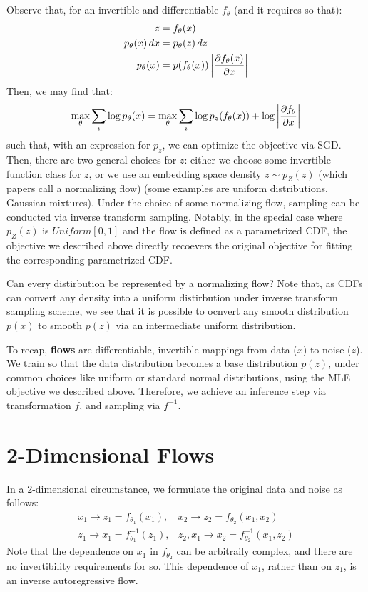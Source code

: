 Observe that, for an invertible and differentiable $f_\theta$ (and it requires so that):
\begin{align*}
    z &= f_\theta (x) \\
    p_\theta (x) \, dx &= p_\theta (z) \, dz \\
    p_\theta (x) &= p(f_\theta (x)) \left| \pdv{f_\theta (x)}{x} \right| \\
\end{align*}
Then, we may find that:
\[
    \max_\theta \sum_i \log p_\theta(x) = \max_\theta \sum_i \log p_z(f_\theta (x)) + \log \left| \pdv{f_\theta}{x} (x) \right|
\]
such that, with an expression for $p_z$, we can optimize the objective via SGD.
Then, there are two general choices for $z$: either we choose some invertible function class for $z$, or we use an embedding space density $z \sim p_Z(z)$ (which papers call a normalizing flow) (some examples are uniform distributions, Gaussian mixtures).
Under the choice of some normalizing flow, sampling can be conducted via inverse transform sampling.
Notably, in the special case where $p_Z(z)$ is $Uniform[0, 1]$ and the flow is defined as a parametrized CDF, the objective we described above directly recoevers the original objective for fitting the corresponding parametrized CDF.

Can every distirbution be represented by a normalizing flow?
Note that, as CDFs can convert any density into a uniform distirbution under inverse transform sampling scheme, we see that it is possible to ocnvert any smooth distribution $p(x)$ to smooth $p(z)$ via an intermediate uniform distribution.

To recap, \textbf{flows} are differentiable, invertible mappings from data ($x$) to noise ($z$).
We train so that the data distribution becomes a base distribution $p(z)$, under common choices like uniform or standard normal distributions, using the MLE objective we described above.
Therefore, we achieve an inference step via transformation $f$, and sampling via $f^{-1}$.

\section{2-Dimensional Flows}
In a 2-dimensional circumstance, we formulate the original data and noise as follows:
\begin{align*}
    x_1 \rightarrow z_1 = f_{\theta_1} (x_1), &
    x_2 \rightarrow z_2 = f_{\theta_2} (x_1, x_2) \\
    z_1 \rightarrow x_1 = f_{\theta_1}^{-1} (z_1), &
    z_2, x_1 \rightarrow x_2 = f_{\theta_2}^{-1} (x_1, z_2)
\end{align*}
Note that the dependence on $x_1$ in $f_{\theta_2}$ can be arbitraily complex, and there are no invertibility requirements for so.
This dependence of $x_1$, rather than on $z_1$, is an inverse autoregressive flow.

